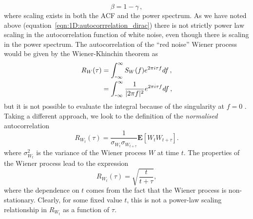 {{\begin{equation}
		\beta = 1-\gamma\,,
	\end{equation}
where scaling exists in both the ACF and the power spectrum. As we have noted above (equation~\ref{eqn:1D:autocorrrelation_dirac}) there is not strictly power law scaling in the autocorrelation function of white noise, even though there is scaling in the power spectrum. The autocorrelation of the ``red noise'' Wiener process would be given by the Wiener-Khinchin theorem as
	\begin{equation}
		\begin{split}
		R_W(\tau) &= \int_{\textup{\texttt{-}} \infty}^\infty S_W(f)e^{2\pi i \tau f} df\,,\\
		&= \int_{\textup{\texttt{-}} \infty}^\infty \frac{1}{|2\pi f|^2}e^{2\pi i \tau f} df\,,
		\end{split}
	\end{equation}
but it is not possible to evaluate the integral because of the singularity at $f=0$ \citep{kammler2007fourier}. Taking a different approach, we look to the definition of the \emph{normalised} autocorrelation
	\begin{equation}
		R_{W_t}(\tau) = \frac{1}{\sigma_{W_t} \sigma_{W_{t+\tau}}} \mathbf{E}\left[W_t W_{t+\tau}\right].
	\end{equation}
where $\sigma_{W_t}^2$ is the variance of the Wiener process $W$ at time $t$. The properties of the Wiener process lead to the expression
	\begin{equation}
		R_{W_t}(\tau) = \sqrt{\frac{t}{t+\tau}}, 
	\end{equation}
\citep{stark2002probability} where the dependence on $t$ comes from the fact that the Wiener process is non-stationary. Clearly, for some fixed value $t$, this is not a power-law scaling relationship in $R_{W_t}$ as a function of $\tau$. 

}}
